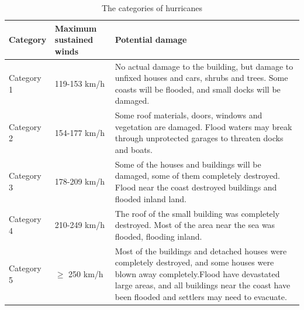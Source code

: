 \documentclass{mcmthesis}
\begin{document}
\begin{table}[!htbp]
  \caption{The categories of hurricanes}
  \renewcommand\arraystretch{1.5}
  \setlength{\abovecaptionskip}{0pt}%
  \setlength{\belowcaptionskip}{10pt}%
  \begin{center}
    \begin{tabular}{p{}p{}m{}}
      \toprule[1.5pt]
      Category   & Maximum sustained winds & Potential damage                                                                                                                                                                                                                         \\
      \midrule

      Category 1 & 119-153 km/h            & No actual damage to the building, but damage to unfixed houses and cars, shrubs and trees. Some coasts will be flooded, and small docks will be damaged.                                                                                 \\

      Category 2 & 154-177 km/h            & Some roof materials, doors, windows and vegetation are damaged. Flood waters may break through unprotected garages to threaten docks and boats.                                                                                          \\

      Category 3 & 178-209 km/h            & Some of the houses and buildings will be damaged, some of them completely destroyed. Flood near the coast destroyed buildings and flooded inland land.                                                                                   \\

      Category 4 & 210-249 km/h            & The roof of the small building was completely destroyed. Most of the area near the sea was flooded, flooding inland.                                                                                                                     \\

      Category 5 & $ \geq $ 250 km/h       & Most of the buildings and detached houses were completely destroyed, and some houses were blown away completely.Flood have devastated large areas, and all buildings near the coast have been flooded and settlers may need to evacuate. \\  \bottomrule[1.5pt]
    \end{tabular}
  \end{center}
\end{table}
\end{document}
